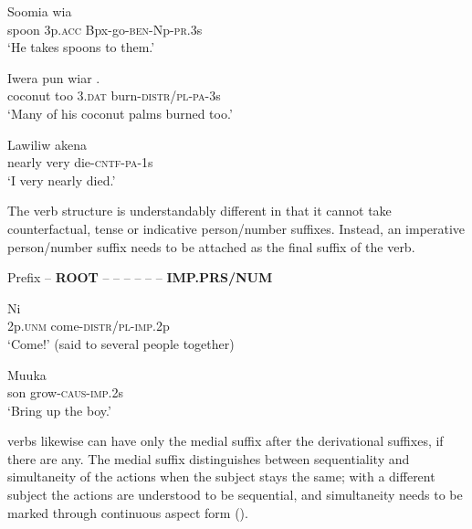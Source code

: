 \ea%
\label{ex:3:x180}
\gll Soomia wia  \\
spoon 3p.\textsc{acc} Bpx-go-\textsc{ben}-Np-\textsc{pr}.3s\\
\glt`He takes spoons to them.'
\z

\ea%
\label{ex:3:x181}
\gll Iwera pun wiar . \\
coconut too 3.\textsc{dat} burn-\textsc{distr}/\textsc{pl}-\textsc{pa}-3s\\
\glt`Many of his coconut palms burned too.'
\z

\ea%
\label{ex:3:x182}
\gll Lawiliw akena  \\
nearly very die-\textsc{cntf}-\textsc{pa}-1s \\
\glt`I very nearly died.'
\z

The  verb structure is understandably different in that it cannot take counterfactual, tense or indicative person/number suffixes. Instead, an imperative person/number suffix needs to be attached as the final suffix of the verb.

Prefix -- \textbf{\textsc{ROOT}} --  --  --  --  --  -- \textbf{\textsc{IMP.PRS/NUM}}

\ea%
\label{ex:3:x183}
\gll Ni  \\
2p.\textsc{unm} come-\textsc{distr}/\textsc{pl}-\textsc{imp}.2p\\
\glt`Come!' (said to several people together) 
\z

\ea%
\label{ex:3:x184}
\gll Muuka  \\
son grow-\textsc{caus}-\textsc{imp}.2s \\
\glt`Bring up the boy.' 
\z

 verbs likewise can have only the medial suffix after the derivational suffixes, if there are any. The medial suffix distinguishes between sequentiality  and simultaneity  of the actions when the subject stays the same; with a different subject  the actions are understood to be sequential, and simultaneity needs to be marked through continuous aspect form ().
 
